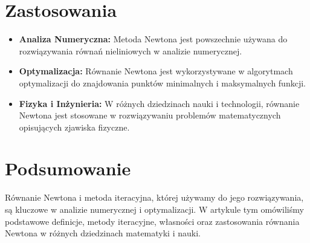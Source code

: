 \documentclass[12pt]{article}
\begin{document}
\section{Zastosowania}
\begin{itemize}
  \item \textbf{Analiza Numeryczna:} Metoda Newtona jest powszechnie używana do rozwiązywania równań nieliniowych w analizie numerycznej.
  
  \item \textbf{Optymalizacja:} Równanie Newtona jest wykorzystywane w algorytmach optymalizacji do znajdowania punktów minimalnych i maksymalnych funkcji.
  
  \item \textbf{Fizyka i Inżynieria:} W różnych dziedzinach nauki i technologii, równanie Newtona jest stosowane w rozwiązywaniu problemów matematycznych opisujących zjawiska fizyczne.
\end{itemize}

\section{Podsumowanie}
Równanie Newtona i metoda iteracyjna, której używamy do jego rozwiązywania, są kluczowe w analizie numerycznej i optymalizacji. W artykule tym omówiliśmy podstawowe definicje, metody iteracyjne, własności oraz zastosowania równania Newtona w różnych dziedzinach matematyki i nauki.
\end{document}
